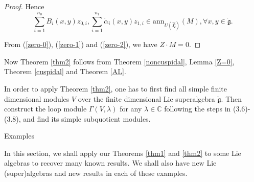 \documentclass[1p]{elsarticle}
\numberwithin{equation}{section}
\def\dg{\dot{\mathfrak{g}}}
\def\ddg{\ddot{\mathfrak{g}}}
\def\fL{\mathfrak{L}}
\def\bC{\mathbb{C}}
\def\ann{\mathrm{ann}}
\def\hL{\hat{\fL}}
\begin{document}
\begin{proof}
Hence
\begin{equation}\label{zero-2} \sum_{i=1}^{n_0}  B_i(x,y)z_{0,i}, \sum_{i=1}^{n_1}\dot\alpha_i(x,y)z_{1,i}\in \ann_{U(\hL)}(M),\forall x,y\in \dg.\end{equation}

From (\ref{zero-0}), (\ref{zero-1}) and (\ref{zero-2}), we have $Z\cdot M=0$.
\end{proof}

Now Theorem \ref{thm2} follows from Theorem \ref{noncuspidal}, Lemma \ref{Z=0}, Theorem \ref{cuspidal} and Theorem \ref{AL}.

In order to apply Theorem \ref{thm2}, one has to first find   all  simple finite dimensional modules $V$ over the finite dimensional Lie superalgebra $\ddg$. Then construct the loop module $\Gamma(V,\lambda)$ for any $\lambda\in\bC$ following the steps in (3.6)-(3.8), and find its simple subquotient modules. 

\begin{section}{Examples}\end{section}

 In this section, we shall apply our  Theorems \ref{thm1} and \ref{thm2} to some Lie algebras to recover many known results. We shall also have  new Lie (super)algebras and new results in  each of these examples.
 
 \
 
\end{document}
